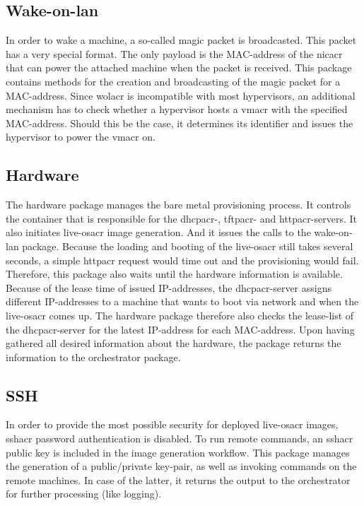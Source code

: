 
\subsection{Wake-on-lan}
In order to wake a machine, a so-called magic packet is broadcasted. This packet has a very special format. The only  payload is the MAC-address of the \gls{nicacr} that can power the attached machine when the packet is received.
\newline
This package contains methods for the creation and broadcasting of the magic packet for a MAC-address. Since \gls{wolacr} is incompatible with most hypervisors, an additional mechanism has to check whether a hypervisor hosts a \gls{vmacr} with the specified MAC-address. Should this be the case, it determines its identifier and issues the hypervisor to power the \gls{vmacr} on.

\subsection{Hardware}
The hardware package manages the bare metal provisioning process. It controls the container that is responsible for the \gls{dhcpacr}-, \gls{tftpacr}- and \gls{httpacr}-servers. It also initiates live-\gls{osacr} image generation. And it issues the calls to the wake-on-lan package. Because the loading and booting of the live-\gls{osacr} still takes several seconds, a simple \gls{httpacr} request would time out and the provisioning would fail. Therefore, this package also waits until the hardware information is available. Because of the lease time of issued IP-addresses, the \gls{dhcpacr}-server assigns different IP-addresses to a machine that wants to boot via network and when the live-\gls{osacr} comes up. The hardware package therefore also checks the lease-list of the \gls{dhcpacr}-server for the latest IP-address for each MAC-address.
\newline
Upon having gathered all desired information about the hardware, the package returns the information to the orchestrator package.

\subsection{SSH}
In order to provide the most possible security for deployed live-\gls{osacr} images, \gls{sshacr} password authentication is disabled. To run remote commands, an \gls{sshacr} public key is included in the image generation workflow. This package manages the generation of a public/private key-pair, as well as invoking commands on the remote machines. In case of the latter, it returns the output to the orchestrator for further processing (like logging).


